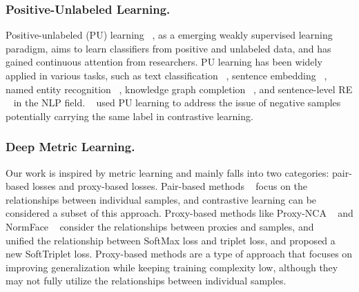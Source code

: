 \documentclass[letterpaper]{article}
\begin{document}
\subsubsection{Positive-Unlabeled Learning.}
Positive-unlabeled (PU) learning ~\cite{DBLP:conf/kdd/ElkanN08,DBLP:conf/nips/PlessisNS14,DBLP:conf/icml/PlessisNS15,DBLP:conf/nips/KiryoNPS17,DBLP:conf/nips/GargWSBL21}, as a emerging weakly supervised learning paradigm, aims to learn classifiers from positive and unlabeled data, and has gained continuous attention from researchers. PU learning has been widely applied in various tasks, such as text classification ~\cite{DBLP:conf/ijcai/LiL03}, sentence embedding ~\cite{DBLP:conf/emnlp/CaoLERMH21}, named entity recognition ~\cite{DBLP:conf/acl/PengXZFH19, DBLP:conf/acl/ZhouLL22}, knowledge graph completion ~\cite{DBLP:conf/ijcai/TangPZZZH022}, and sentence-level RE ~\cite{DBLP:conf/aaai/HeC0ZWZ20} in the NLP field. ~\cite{DBLP:conf/nips/ChuangRL0J20} used PU learning to address the issue of negative samples potentially carrying the same label in contrastive learning.

\subsubsection{Deep Metric Learning.}
Our work is inspired by metric learning and mainly falls into two categories: pair-based losses and proxy-based losses. Pair-based methods ~\cite{DBLP:conf/cvpr/HadsellCL06,DBLP:conf/cvpr/SchroffKP15,DBLP:conf/nips/Sohn16,DBLP:conf/cvpr/WangHHDS19} focus on the relationships between individual samples, and contrastive learning can be considered a subset of this approach. Proxy-based methods like Proxy-NCA ~\cite{DBLP:conf/iccv/Movshovitz-Attias17} and NormFace ~\cite{DBLP:conf/mm/WangXCY17} consider the relationships between proxies and samples, and ~\cite{DBLP:conf/iccv/QianSSHTLJ19} unified the relationship between SoftMax loss and triplet loss, and proposed a new SoftTriplet loss. Proxy-based methods are a type of approach that focuses on improving generalization while keeping training complexity low, although they may not fully utilize the relationships between individual samples.
\end{document}
